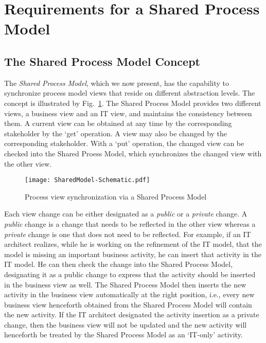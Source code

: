\section{Requirements for a Shared Process Model}
\label{sec:requirements}

\subsection{The Shared Process Model Concept}

The \emph{Shared Process Model}, which we now present, has the capability to synchronize process model views that reside on different abstraction levels.
The concept is illustrated by Fig.~\ref{fig:SharedModel-Concept}. The Shared Process Model provides two different views, a business view and an IT view, and maintains the consistency between them. A current view can be obtained at any time by the corresponding stakeholder by the `get' operation. A view may also be changed by the corresponding stakeholder. With a `put' operation, the changed view can be checked into the Shared Proess Model, which synchronizes the changed view with the other view.

\begin{figure}[bt]
\begin{center}
\texttt{[image: SharedModel-Schematic.pdf]} %
\caption{Process view synchronization via a Shared Process Model}
\label{fig:SharedModel-Concept}
\end{center}
\end{figure}

Each view change can be either designated as a \emph{public} or a \emph{private} change. A \emph{public} change is a change that needs to be reflected in the other view whereas a \emph{private} change is one that does not need to be reflected. For example, if an IT architect realizes, while he is working on the refinement of the IT model, that the model is missing an important business activity, he can insert that activity in the IT model. He can then check the change into the Shared Process Model, designating it as a public change to express that the activity should be inserted in the business view as well. The Shared Process Model then inserts the new activity in the business view automatically at the right position, i.e., every new business view henceforth obtained from the Shared Process Model will contain the new activity. If the IT architect designated the activity insertion as a private change, then the business view will not be updated and the new activity will henceforth be treated by the Shared Process Model as an `IT-only' activity.

